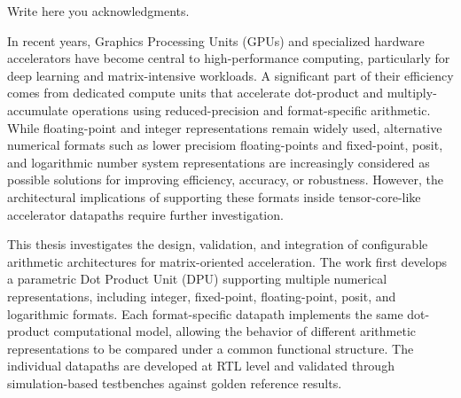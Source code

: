 \documentclass[a4paper,11pt,twoside,english]{toptesi}
\begin{document}
\english






\frontespizio %

\ringraziamenti

Write here you acknowledgments. 

\abstract
In recent years, Graphics Processing Units (GPUs) and specialized hardware accelerators have become central to high-performance computing, particularly for deep learning and matrix-intensive workloads. A significant part of their efficiency comes from dedicated compute units that accelerate dot-product and multiply-accumulate operations using reduced-precision and format-specific arithmetic. While floating-point and integer representations remain widely used, alternative numerical formats such as lower precisiom floating-points and fixed-point, posit, and logarithmic number system representations are increasingly considered as possible solutions for improving efficiency, accuracy, or robustness. However, the architectural implications of supporting these formats inside tensor-core-like accelerator datapaths require further investigation.

This thesis investigates the design, validation, and integration of configurable arithmetic architectures for matrix-oriented acceleration. The work first develops a parametric Dot Product Unit (DPU) supporting multiple numerical representations, including integer, fixed-point, floating-point, posit, and logarithmic formats. Each format-specific datapath implements the same dot-product computational model, allowing the behavior of different arithmetic representations to be compared under a common functional structure. The individual datapaths are developed at RTL level and validated through simulation-based testbenches against golden reference results.
\end{document}

